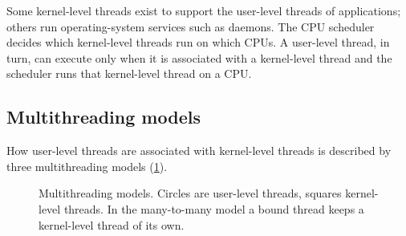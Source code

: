 \documentclass[../main.tex]{subfiles}
\begin{document}
Some kernel-level threads exist to support the user-level threads of
applications; others run operating-system services such as
daemons.  The
CPU scheduler decides which kernel-level threads run on which CPUs.  A
user-level thread, in turn, can execute only when it is associated with a
kernel-level thread and the scheduler runs that kernel-level thread on a CPU.

\subsection{Multithreading models}

How user-level threads are associated with kernel-level threads is
described by three multithreading models
(\cref{fig:l03-mt-models}).

\begin{figure}[htbp]
  \centering
  
  \caption{Multithreading models.  Circles are user-level threads, squares
    kernel-level threads.  In the many-to-many model a bound thread keeps a
    kernel-level thread of its own.}
  \label{fig:l03-mt-models}
\end{figure}
\end{document}
